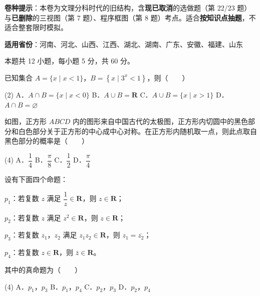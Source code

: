 

\begin{gknotice}
\textbf{ 卷种提示}：本卷为文理分科时代的旧结构，含\textbf{现已取消}的选做题（第 22/23 题）与\textbf{已删除}的三视图（第 7 题）、程序框图（第 8 题）考点。适合\textbf{按知识点抽题}，不适合整套限时模拟。

\textbf{适用省份}：河南、河北、山西、江西、湖北、湖南、广东、安徽、福建、山东
\end{gknotice}

\par\medskip


\begin{gktip}
本题共 12 小题，每小题 5 分，共 60 分。
\end{gktip}

已知集合 $A=\{x\mid x<1\}$，$B=\left\{x\mid3^{x}<1\right\}$，则（　　）

\begin{gkopts}(2)
\task A．$A\cap B=\{x\mid x<0\}$
\task B．$A\cup B=\mathbf R$
\task C．$A\cup B=\{x\mid x>1\}$
\task D．$A\cap B=\varnothing$
\end{gkopts}

如图，正方形 $ABCD$ 内的图形来自中国古代的太极图，正方形内切圆中的黑色部分和白色部分关于正方形的中心成中心对称。在正方形内随机取一点，则此点取自黑色部分的概率是（　　）

\begin{center}\end{center}

\begin{gkopts}(4)
\task A．$\dfrac14$
\task B．$\dfrac\pi8$
\task C．$\dfrac12$
\task D．$\dfrac\pi4$
\end{gkopts}

设有下面四个命题：

  $p_1$：若复数 $z$ 满足 $\dfrac1z\in\mathbf R$，则 $z\in\mathbf R$；

  $p_2$：若复数 $z$ 满足 $z^{2}\in\mathbf R$，则 $z\in\mathbf R$；

  $p_3$：若复数 $z_1$，$z_2$ 满足 $z_1z_2\in\mathbf R$，则 $z_1=\overline{z_2}$；

  $p_4$：若复数 $z\in\mathbf R$，则 $\bar z\in\mathbf R$。

其中的真命题为（　　）

\begin{gkopts}(4)
\task A．$p_1$，$p_3$
\task B．$p_1$，$p_4$
\task C．$p_2$，$p_3$
\task D．$p_2$，$p_4$
\end{gkopts}


